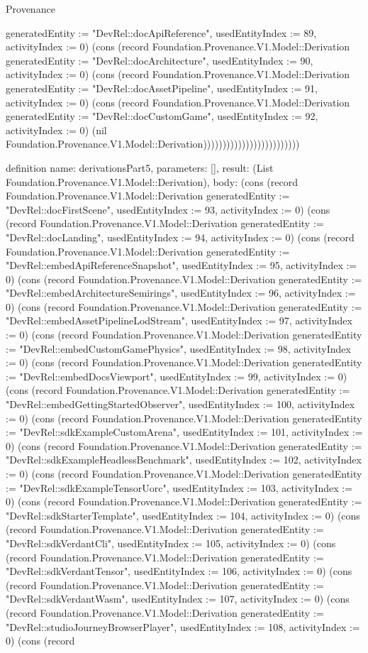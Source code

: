 \begin{lexlean}{Provenance}
\begin{semanticmodule}
{{generatedEntity := "DevRel::docApiReference", usedEntityIndex := 89, activityIndex := 0}) (cons (record Foundation.Provenance.V1.Model::Derivation {generatedEntity := "DevRel::docArchitecture", usedEntityIndex := 90, activityIndex := 0}) (cons (record Foundation.Provenance.V1.Model::Derivation {generatedEntity := "DevRel::docAssetPipeline", usedEntityIndex := 91, activityIndex := 0}) (cons (record Foundation.Provenance.V1.Model::Derivation {generatedEntity := "DevRel::docCustomGame", usedEntityIndex := 92, activityIndex := 0}) (nil Foundation.Provenance.V1.Model::Derivation)))))))))))))))))))))))))
}

definition{
  name: derivationsPart5,
  parameters: [],
  result: (List Foundation.Provenance.V1.Model::Derivation),
  body: (cons (record Foundation.Provenance.V1.Model::Derivation {generatedEntity := "DevRel::docFirstScene", usedEntityIndex := 93, activityIndex := 0}) (cons (record Foundation.Provenance.V1.Model::Derivation {generatedEntity := "DevRel::docLanding", usedEntityIndex := 94, activityIndex := 0}) (cons (record Foundation.Provenance.V1.Model::Derivation {generatedEntity := "DevRel::embedApiReferenceSnapshot", usedEntityIndex := 95, activityIndex := 0}) (cons (record Foundation.Provenance.V1.Model::Derivation {generatedEntity := "DevRel::embedArchitectureSemirings", usedEntityIndex := 96, activityIndex := 0}) (cons (record Foundation.Provenance.V1.Model::Derivation {generatedEntity := "DevRel::embedAssetPipelineLodStream", usedEntityIndex := 97, activityIndex := 0}) (cons (record Foundation.Provenance.V1.Model::Derivation {generatedEntity := "DevRel::embedCustomGamePhysics", usedEntityIndex := 98, activityIndex := 0}) (cons (record Foundation.Provenance.V1.Model::Derivation {generatedEntity := "DevRel::embedDocsViewport", usedEntityIndex := 99, activityIndex := 0}) (cons (record Foundation.Provenance.V1.Model::Derivation {generatedEntity := "DevRel::embedGettingStartedObserver", usedEntityIndex := 100, activityIndex := 0}) (cons (record Foundation.Provenance.V1.Model::Derivation {generatedEntity := "DevRel::sdkExampleCustomArena", usedEntityIndex := 101, activityIndex := 0}) (cons (record Foundation.Provenance.V1.Model::Derivation {generatedEntity := "DevRel::sdkExampleHeadlessBenchmark", usedEntityIndex := 102, activityIndex := 0}) (cons (record Foundation.Provenance.V1.Model::Derivation {generatedEntity := "DevRel::sdkExampleTensorUorc", usedEntityIndex := 103, activityIndex := 0}) (cons (record Foundation.Provenance.V1.Model::Derivation {generatedEntity := "DevRel::sdkStarterTemplate", usedEntityIndex := 104, activityIndex := 0}) (cons (record Foundation.Provenance.V1.Model::Derivation {generatedEntity := "DevRel::sdkVerdantCli", usedEntityIndex := 105, activityIndex := 0}) (cons (record Foundation.Provenance.V1.Model::Derivation {generatedEntity := "DevRel::sdkVerdantTensor", usedEntityIndex := 106, activityIndex := 0}) (cons (record Foundation.Provenance.V1.Model::Derivation {generatedEntity := "DevRel::sdkVerdantWasm", usedEntityIndex := 107, activityIndex := 0}) (cons (record Foundation.Provenance.V1.Model::Derivation {generatedEntity := "DevRel::studioJourneyBrowserPlayer", usedEntityIndex := 108, activityIndex := 0}) (cons (record }
\end{semanticmodule}
\end{lexlean}
